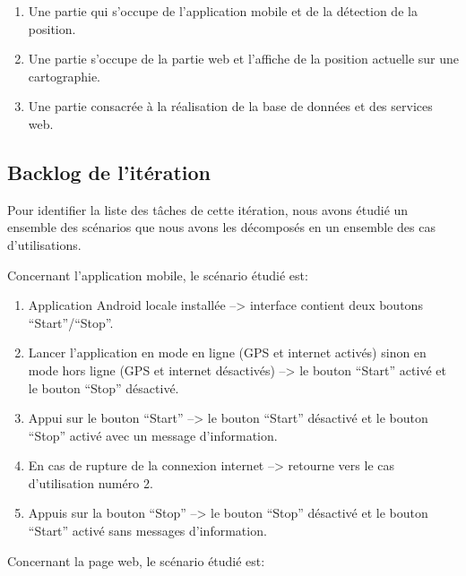 \begin{enumerate}
    \item Une partie qui s'occupe de l'application mobile et de la détection de
        la position.
    \item Une partie  s'occupe de la partie web et l'affiche de la position
        actuelle sur une cartographie.
    \item Une partie consacrée à la réalisation de la base de données et des
        services web.
\end{enumerate}

\subsection{Backlog de l'itération}

Pour identifier la liste des tâches de cette itération, nous avons étudié un
ensemble des scénarios que nous avons les décomposés en un ensemble des cas
d'utilisations.

Concernant l'application mobile, le scénario étudié est:

\begin{enumerate}
    \item Application Android locale installée --> interface contient deux
        boutons ``Start''/``Stop''.
    \item Lancer l'application en mode en ligne (\acrshort{GPS} et internet
        activés) sinon en mode hors ligne (\acrshort{GPS} et internet
        désactivés) --> le bouton ``Start'' activé et le bouton ``Stop''
        désactivé.
    \item Appui sur le bouton ``Start'' -->  le bouton ``Start'' désactivé et
        le bouton ``Stop'' activé avec un message d'information.
    \item En cas de rupture de la connexion internet --> retourne vers le cas
        d'utilisation numéro 2.
    \item Appuis sur la bouton ``Stop'' --> le bouton ``Stop'' désactivé et le
        bouton ``Start'' activé sans messages d'information.
\end{enumerate}

Concernant la page web, le scénario étudié est:

